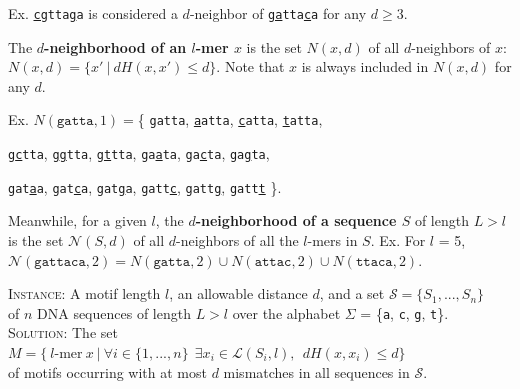 \documentclass[oneside,12pt]{DISCSthesis}
\begin{document}
		\noindent \hspace*{35pt} Ex. \texttt{\ul{cg}tta\ul{g}a} is considered a $d$-neighbor of \texttt{\ul{ga}tta\ul{c}a} for any $d \geq 3$.\newline

		\noindent The \textbf{\boldmath $d$-neighborhood of an $l$-mer $x$} is the set {\boldmath $N(x, d)$} of all $d$-neighbors of $x$: $N(x,d) = \{ x'\ |\ dH(x, x') \leq d\}$. Note that $x$ is always included in $N(x,d)$ for any $d$.\newline
		
		\noindent\begin{minipage}{\textwidth} {
				\noindent\hspace*{35pt} Ex. $N(\texttt{gatta}, 1) =$\{ \texttt{gatta},
					\texttt{\ul{a}atta}, \texttt{\ul{c}atta}, \texttt{\ul{t}atta},				
					
					\hspace*{150pt}\texttt{g\ul{c}tta}, \texttt{g\ul{g}tta}, \texttt{g\ul{t}tta},
					\texttt{ga\ul{a}ta}, \texttt{ga\ul{c}ta}, \texttt{ga\ul{g}ta},

				 	\hspace*{150pt}\texttt{gat\ul{a}a}, \texttt{gat\ul{c}a}, \texttt{gat\ul{g}a},
				 	\texttt{gatt\ul{c}}, \texttt{gatt\ul{g}}, \texttt{gatt\ul{t}} \}.

		}\end{minipage}\newline

		\noindent Meanwhile, for a given $l$, the \textbf{\boldmath $d$-neighborhood of a sequence $S$} of length $L > l$ is the set {\boldmath $\mathcal{N}(S, d)$} of all $d$-neighbors of all the $l$-mers in $S$.
		\newline\hspace*{35pt} Ex. For $l$ = 5,
			$\mathcal{N}(\texttt{gattaca}, 2) 
					= N(\texttt{gatta}, 2) \cup 
						N(\texttt{attac}, 2) \cup
						N(\texttt{ttaca}, 2)$.\newline
		
		\newline
		\noindent \textsc{Instance:} A motif length $l$, an allowable distance $d$, and a set $\mathcal{S} = \{S_{1},..., S_{n}\}$\\
		\noindent\hspace*{55pt}of $n$ DNA sequences of length $L > l$ over the alphabet $\Sigma$ = \{\texttt{a}, \texttt{c}, \texttt{g}, \texttt{t}\}.\newline
		\noindent \textsc{Solution:} The set $M = \{\ l\text{-mer}\ x\ |\ \forall i \in \{1,...,n\}\ \ \exists x_i \in \mathcal{L}(S_i,l),\ \ dH(x, x_i) \leq d \}$\\
		\noindent\hspace*{55pt}of motifs occurring with at most $d$ mismatches in all sequences in $\mathcal{S}$.
		\newpage
\end{document}
